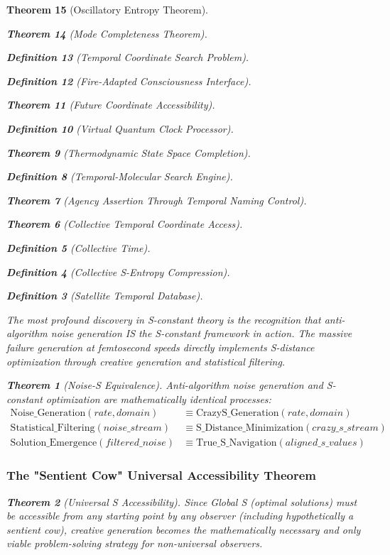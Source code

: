 \documentclass[12pt,a4paper]{article}
\newtheorem{theorem}{Theorem}[section]
\newtheorem{definition}[theorem]{Definition}
\begin{document}
\begin{theorem}[Oscillatory Entropy Theorem]
\begin{theorem}[Mode Completeness Theorem]
\begin{enumerate}
\begin{definition}[Temporal Coordinate Search Problem]
\begin{algorithm}
\begin{definition}[Fire-Adapted Consciousness Interface]
\begin{theorem}[Future Coordinate Accessibility]
\begin{definition}[Virtual Quantum Clock Processor]
\begin{itemize}
\begin{itemize}
\begin{theorem}[Thermodynamic State Space Completion]
\begin{definition}[Temporal-Molecular Search Engine]
\begin{theorem}[Agency Assertion Through Temporal Naming Control]
\begin{remark}
\begin{theorem}[Collective Temporal Coordinate Access]
\begin{definition}[Collective Time]
\begin{definition}[Collective S-Entropy Compression]
\begin{definition}[Satellite Temporal Database]
\begin{algorithm}
\begin{table}[h]
{{The most profound discovery in S-constant theory is the recognition that anti-algorithm noise generation IS the S-constant framework in action. The massive failure generation at femtosecond speeds directly implements S-distance optimization through creative generation and statistical filtering.

\begin{theorem}[Noise-S Equivalence]
Anti-algorithm noise generation and S-constant optimization are mathematically identical processes:
\begin{align}
\text{Noise\_Generation}(rate, domain) &\equiv \text{CrazyS\_Generation}(rate, domain) \\
\text{Statistical\_Filtering}(noise\_stream) &\equiv \text{S\_Distance\_Minimization}(crazy\_s\_stream) \\
\text{Solution\_Emergence}(filtered\_noise) &\equiv \text{True\_S\_Navigation}(aligned\_s\_values)
\end{align}
\end{theorem}

\subsubsection{The "Sentient Cow" Universal Accessibility Theorem}

\begin{theorem}[Universal S Accessibility]
Since Global S (optimal solutions) must be accessible from any starting point by any observer (including hypothetically a sentient cow), creative generation becomes the mathematically necessary and only viable problem-solving strategy for non-universal observers.
\end{theorem}

}}
\end{table}
\end{algorithm}
\end{definition}
\end{definition}
\end{definition}
\end{theorem}
\end{remark}
\end{theorem}
\end{definition}
\end{theorem}
\end{itemize}
\end{itemize}
\end{definition}
\end{theorem}
\end{definition}
\end{algorithm}
\end{definition}
\end{enumerate}
\end{theorem}
\end{theorem}
\end{document}
